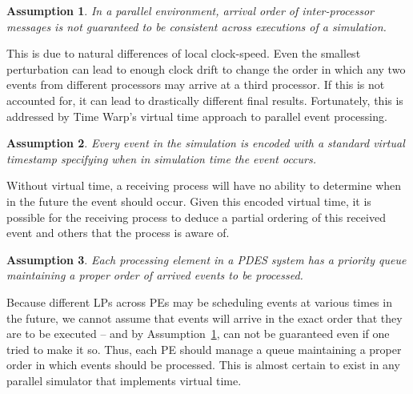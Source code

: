\documentclass[nonacm,sigconf]{acmart}
\newtheorem{assumption}{Assumption}
\begin{document}
\begin{assumption}\label{as:inter-ordering}
  In a parallel environment, arrival order of inter-processor messages is not guaranteed to be consistent across executions of a simulation.
\end{assumption}

This is due to natural differences of local clock-speed. Even the smallest perturbation can lead to enough clock drift to change the order in which any two events from different processors may arrive at a third processor. If this is not accounted for, it can lead to drastically different final results. Fortunately, this is addressed by Time Warp's virtual time approach to parallel event processing.

\begin{assumption}\label{as:timestamp}
  Every event in the simulation is encoded with a standard virtual timestamp specifying when in simulation time the event occurs.
\end{assumption}

Without virtual time, a receiving process will have no ability to determine when in the future the event should occur. Given this encoded virtual time, it is possible for the receiving process to deduce a partial ordering of this received event and others that the process is aware of.

\begin{assumption}\label{as:pe-queues}
  Each processing element in a PDES system has a priority queue maintaining a proper order of arrived events to be processed.
\end{assumption}

Because different LPs across PEs may be scheduling events at various times in the future, we cannot assume that events will arrive in the exact order that they are to be executed -- and by Assumption~\ref{as:inter-ordering}, can not be guaranteed even if one tried to make it so. Thus, each PE should manage a queue maintaining a proper order in which events should be processed. This is almost certain to exist in any parallel simulator that implements virtual time.


\end{document}
